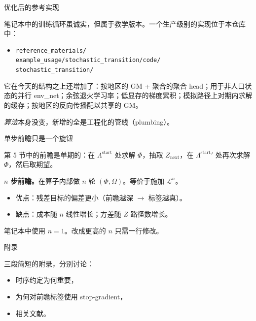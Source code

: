 \documentclass[10pt,aspectratio=169]{beamer}
\newcommand{\Lstart}{\Lambda^{\mathrm{start}}}
\newcommand{\Lop}{\mathcal{L}}
\begin{document}
\begin{frame}{优化后的参考实现}

笔记本中的训练循环虽诚实，但属于教学版本。一个生产级别的实现位于本仓库中：

\begin{itemize}
  \item \texttt{reference\_materials/}\\\texttt{example\_usage/stochastic\_transition/code/}\\\texttt{stochastic\_transition/}
\end{itemize}

\smallskip

它在今天的结构之上还增加了：按地区的 GM + 聚合的聚合 head；用于非人口状态的并行 env\_net；余弦退火学习率；低显存的梯度累积；模拟路径上对期内求解的缓存；按地区的反向传播配以共享的 GM。

\smallskip

\emph{算法}本身没变，新增的全是工程化的管线（plumbing）。

\end{frame}

\begin{frame}{单步前瞻只是一个旋钮}

第 5 节中的前瞻是单期的：在 $\Lstart$ 处求解 $\Phi$，抽取 $Z_\text{next}$，在 $\Lstart{}'$ 处再次求解 $\Phi$，然后取期望。

\smallskip

\textbf{$n$ 步前瞻。}在算子内部做 $n$ 轮 $(\Phi, \Omega)$。等价于施加 $\Lop^n$。

\smallskip

\begin{itemize}
  \item 优点：残差目标的偏差更小（前瞻越深 $\to$ 标签越真）。
  \item 缺点：成本随 $n$ 线性增长；方差随 $Z$ 路径数增长。
\end{itemize}

笔记本中使用 $n = 1$。改成更高的 $n$ 只需一行修改。

\end{frame}

\appendix

\begin{frame}{附录}
\begin{center}
\Large 三段简短的附录，分别讨论：

\begin{itemize}
  \item 时序约定为何重要，
  \item 为何对前瞻标签使用 stop-gradient，
  \item 相关文献。
\end{itemize}

\end{center}
\end{frame}
\end{document}
